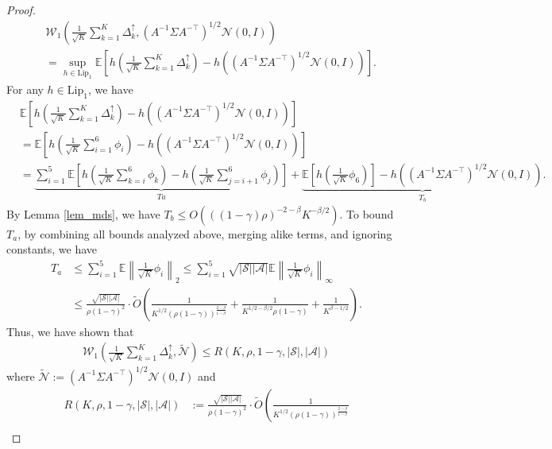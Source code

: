 \documentclass{opt2025} %
\begin{document}
\begin{proof}
\begin{align*}
&\mathcal{W}_1 \left( \frac{1}{\sqrt{K}} \sum_{k=1}^K\Delta^{\uparrow}_{k}, (A^{-1}\Sigma A^{-\top})^{1/2}\mathcal{N}(0,I)  \right) \\
&= \sup_{h 
\in \mathrm{Lip}_1} \mathbb{E}\left[ h\left( \frac{1}{\sqrt{K}} \sum_{k=1}^K\Delta^{\uparrow}_{k} \right) -h((A^{-1}\Sigma A^{-\top})^{1/2}\mathcal{N}(0,I)) \right].
\end{align*}
For any $h\in\mathrm{Lip}_1$, we have
\begin{align*}
&\mathbb{E}\left[ h\left( \frac{1}{\sqrt{K}} \sum_{k=1}^K\Delta^{\uparrow}_{k} \right) -h((A^{-1}\Sigma A^{-\top})^{1/2}\mathcal{N}(0,I)) \right]\\
&=\mathbb{E}\left[ h\left( \frac{1}{\sqrt{K}}\sum_{i=1}^6 \phi_i \right) -h((A^{-1}\Sigma A^{-\top})^{1/2}\mathcal{N}(0,I)) \right]\\
&=\underbrace{\sum_{i=1}^5 \mathbb{E}\left[ h\left( \frac{1}{\sqrt{K}}\sum_{k=i}^6 \phi_k \right) - h\left( \frac{1}{\sqrt{K}} \sum_{j=i+1}^6 \phi_j \right) \right]}_{Ta} + \underbrace{\mathbb{E}\left[h\left(\frac{1}{\sqrt{K}}\phi_6\right)\right] - h((A^{-1}\Sigma A^{-\top})^{1/2}\mathcal{N}(0,I))}_{T_b}.
\end{align*}
By Lemma \ref{lem_mds}, we have $T_b \leq O\left( ((1-\gamma)\rho)^{-2-\beta}K^{-\beta/2} \right).$ To bound $T_a$, by combining all bounds analyzed above, merging alike terms, and ignoring constants, we have
\begin{align*}
T_a &\leq \sum_{i=1}^5 \mathbb{E}\left\|\frac{1}{\sqrt{K}} \phi_i\right\|_2 \leq  \sum_{i=1}^5 \sqrt{|\mathcal{S}||\mathcal{A}|}\mathbb{E}\left\| \frac{1}{\sqrt{K}} \phi_i \right\|_{\infty} \\
&\leq \frac{\sqrt{{|\mathcal{S}||\mathcal{A}|}}}{\rho(1-\gamma)^2} \cdot \tilde{O}\left( \frac{1}{K^{1/2} (\rho(1-\gamma))^{\frac{2-\beta}{1-\beta}}} + \frac{1}{K^{1/2-\beta/2}\rho(1-\gamma)} + \frac{1}{K^{\beta-1/2}} \right).
\end{align*}
Thus, we have shown that
\begin{align*}
\mathcal{W}_1 \left( \frac{1}{\sqrt{K}} \sum_{k=1}^K\Delta^{\uparrow}_{k}, \tilde{\mathcal{N}}  \right) \leq R(K,\rho,1-\gamma,|\mathcal{S}|,|\mathcal{A}|)
\end{align*}
where $\tilde{\mathcal{N}}:=(A^{-1}\Sigma A^{-\top})^{1/2}\mathcal{N}(0,I)$ and
\begin{align*}
R(K,\rho,1-\gamma,|\mathcal{S}|,|\mathcal{A}|) &:= \frac{\sqrt{{|\mathcal{S}||\mathcal{A}|}}}{\rho(1-\gamma)^2} \cdot \tilde{O}\left( \frac{1}{K^{1/2} (\rho(1-\gamma))^{\frac{2-\beta}{1-\beta}}} \right. \\

\end{align*}
\end{proof}
\end{document}
